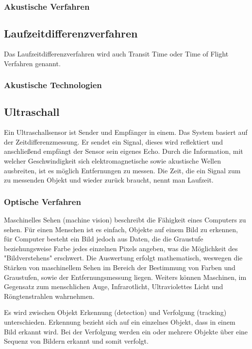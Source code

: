     \subsubsection{Akustische Verfahren}
    \subsection*{Laufzeitdifferenzverfahren}
    Das Laufzeitdifferenzverfahren wird auch Transit Time oder Time of Flight Verfahren genannt. \cite{akustischeverfahren}
    \subsubsection{Akustische Technologien}
    \subsection*{Ultraschall}
    Ein Ultraschallsensor ist Sender und Empfänger in einem. Das System basiert auf der Zeitdifferenzmessung. Er sendet ein Signal, dieses wird reflektiert und anschließend empfängt der Sensor sein eigenes Echo.
    Durch die Information, mit welcher Geschwindigkeit sich elektromagnetische sowie akustische Wellen ausbreiten, ist es möglich Entfernungen zu messen. Die Zeit, die ein Signal zum zu messenden Objekt und wieder zurück braucht, nennt man Laufzeit.


    \subsubsection{Optische Verfahren}
    Maschinelles Sehen (machine vision) beschreibt die Fähigkeit eines Computers zu sehen. 
    Für einen Menschen ist es einfach, Objekte auf einem Bild zu erkennen, für Computer besteht ein Bild jedoch aus Daten, die die Graustufe beziehungsweise Farbe jedes einzelnen Pixels angeben, was die Möglichkeit des "Bildverstehens" erschwert.
    Die Auswertung erfolgt mathematisch, weswegen die Stärken von maschinellem Sehen im Bereich der Bestimmung von Farben und Graustufen, sowie der Entfernungsmessung liegen. Weiters können Maschinen, im Gegensatz zum menschlichen Auge, Infrarotlicht, Ultraviolettes Licht und Röngtenstrahlen wahrnehmen. \cite{machinevision} \cite{machinevision2}

    Es wird zwischen Objekt Erkennung (detection) und Verfolgung (tracking) unterschieden. Erkennung bezieht sich auf ein einzelnes Objekt, dass in einem Bild erkannt wird. Bei der Verfolgung werden ein oder mehrere Objekte über eine Sequenz von Bildern erkannt und somit verfolgt.
    \cite{obj_det_trak}

